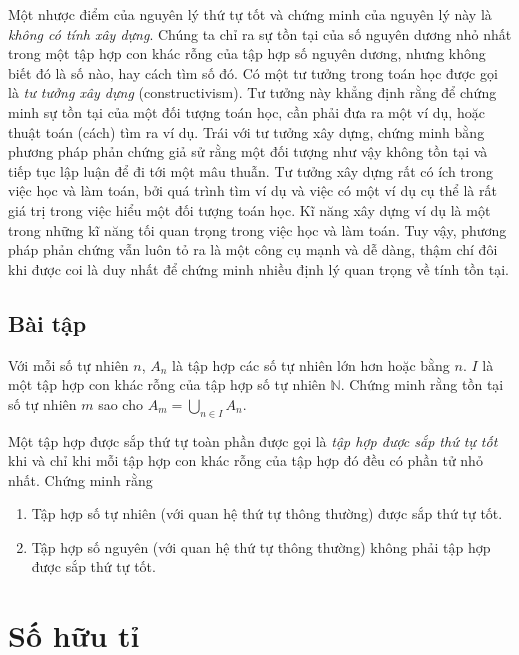 Một nhược điểm của nguyên lý thứ tự tốt và chứng minh của nguyên lý này là \textit{không có tính xây dựng}. Chúng ta chỉ ra sự tồn tại của số nguyên dương nhỏ nhất trong một tập hợp con khác rỗng của tập hợp số nguyên dương, nhưng không biết đó là số nào, hay cách tìm số đó. Có một tư tưởng trong toán học được gọi là \textit{tư tưởng xây dựng} (constructivism). Tư tưởng này khẳng định rằng để chứng minh sự tồn tại của một đối tượng toán học, cần phải đưa ra một ví dụ, hoặc thuật toán (cách) tìm ra ví dụ. Trái với tư tưởng xây dựng, chứng minh bằng phương pháp phản chứng giả sử rằng một đối tượng như vậy không tồn tại và tiếp tục lập luận để đi tới một mâu thuẫn. Tư tưởng xây dựng rất có ích trong việc học và làm toán, bởi quá trình tìm ví dụ và việc có một ví dụ cụ thể là rất giá trị trong việc hiểu một đối tượng toán học. Kĩ năng xây dựng ví dụ là một trong những kĩ năng tối quan trọng trong việc học và làm toán. Tuy vậy, phương pháp phản chứng vẫn luôn tỏ ra là một công cụ mạnh và dễ dàng, thậm chí đôi khi được coi là duy nhất để chứng minh nhiều định lý quan trọng về tính tồn tại.

\subsection{Bài tập}

\begin{exercise}
    Với mỗi số tự nhiên $n$, $A_{n}$ là tập hợp các số tự nhiên lớn hơn hoặc bằng $n$. $I$ là một tập hợp con khác rỗng của tập hợp số tự nhiên $\mathbb{N}$. Chứng minh rằng tồn tại số tự nhiên $m$ sao cho $A_{m} = \bigcup_{n\in I} A_{n}$.
\end{exercise}

\begin{exercise}\label{exercise:well-ordered-set}
    Một tập hợp được sắp thứ tự toàn phần được gọi là \textit{tập hợp được sắp thứ tự tốt} khi và chỉ khi mỗi tập hợp con khác rỗng của tập hợp đó đều có phần tử nhỏ nhất. Chứng minh rằng
    \begin{enumerate}[label={(\roman*)}]
        \item Tập hợp số tự nhiên (với quan hệ thứ tự thông thường) được sắp thứ tự tốt.
        \item Tập hợp số nguyên (với quan hệ thứ tự thông thường) không phải tập hợp được sắp thứ tự tốt.
    \end{enumerate}
\end{exercise}

\section{Số hữu tỉ}

